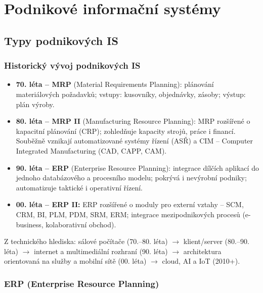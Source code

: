 \section{Podnikové informační systémy}

\subsection{Typy podnikových IS}

\subsubsection{Historický vývoj podnikových IS}

\begin{itemize}
  \item \textbf{70. léta -- MRP} (Material Requirements Planning): plánování materiálových
    požadavků; vstupy: kusovníky, objednávky, zásoby; výstup: plán výroby.
  \item \textbf{80. léta -- MRP II} (Manufacturing Resource Planning): MRP rozšířené o kapacitní
    plánování (CRP); zohledňuje kapacity strojů, práce i financí. Souběžně vznikají automatizované
    systémy řízení (ASŘ) a CIM -- Computer Integrated Manufacturing (CAD, CAPP, CAM).
  \item \textbf{90. léta -- ERP} (Enterprise Resource Planning): integrace dílčích aplikací do
    jednoho databázového a procesního modelu; pokrývá i nevýrobní podniky; automatizuje taktické
    i operativní řízení.
  \item \textbf{00. léta -- ERP II:} ERP rozšířené o moduly pro externí vztahy -- SCM, CRM, BI,
    PLM, PDM, SRM, ERM; integrace mezipodnikových procesů (e-business, kolaborativní obchod).
\end{itemize}

Z technického hlediska: sálové počítače (70.--80. léta) $\rightarrow$ klient/server (80.--90.
léta) $\rightarrow$ internet a multimediální rozhraní (90. léta) $\rightarrow$ architektura
orientovaná na služby a mobilní sítě (00. léta) $\rightarrow$ cloud, AI a IoT (2010+).

\subsubsection{ERP (Enterprise Resource Planning)}

